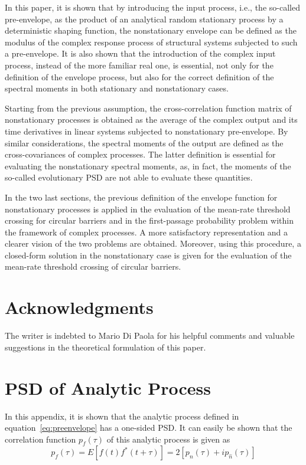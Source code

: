 \documentclass[11pt]{article}
\begin{document}
In this paper, it is shown that by introducing the input process, i.e., the so-called pre-envelope, as the product of an analytical random stationary process by a deterministic shaping function, the nonstationary envelope can be defined as the modulus of the complex response process of structural systems subjected to such a pre-envelope. It is also shown that the introduction of the complex input process, instead of the more familiar real one, is essential, not only for the definition of the envelope process, but also for the correct definition of the spectral moments in both stationary and nonstationary cases.

Starting from the previous assumption, the cross-correlation function matrix of nonstationary processes is obtained as the average of the complex output and its time derivatives in linear systems subjected to nonstationary pre-envelope. By similar considerations, the spectral moments of the output are defined as the cross-covariances of complex processes. The latter definition is essential for evaluating the nonstationary spectral moments, as, in fact, the moments of the so-called evolutionary PSD are not able to evaluate these quantities.

In the two last sections, the previous definition of the envelope function for nonstationary processes is applied in the evaluation of the mean-rate threshold crossing for circular barriers and in the first-passage probability problem within the framework of complex processes. A more satisfactory representation and a clearer vision of the two problems are obtained. Moreover, using this procedure, a closed-form solution in the nonstationary case is given for the evaluation of the mean-rate threshold crossing of circular barriers.

\section*{Acknowledgments}

The writer is indebted to Mario Di Paola for his helpful comments and valuable suggestions in the theoretical formulation of this paper.

\appendix

\section{PSD of Analytic Process}
\label{app:psd}

In this appendix, it is shown that the analytic process defined in equation~\eqref{eq:preenvelope} has a one-sided PSD. It can easily be shown that the correlation function $p_f(\tau)$ of this analytic process is given as
\begin{equation}
p_f(\tau) = E[f(t)f^*(t + \tau)] = 2[p_n(\tau) + ip_{\hat{n}}(\tau)]
\label{eq:pf_correlation}
\end{equation}
\end{document}

